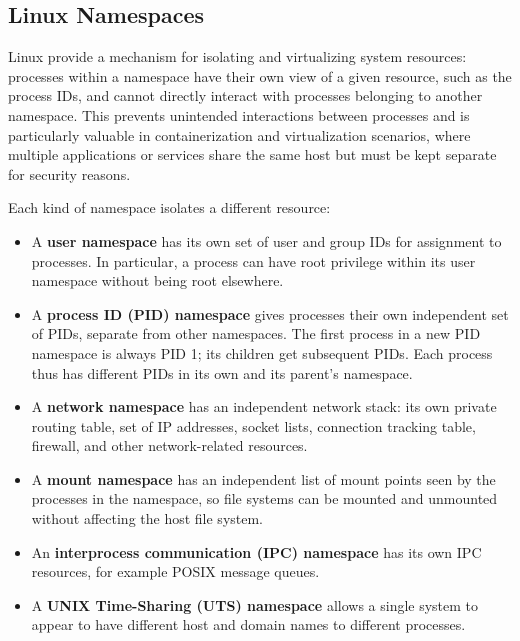\subsection{Linux Namespaces} \label{sec:linux_namespaces}

Linux  provide a mechanism for isolating and virtualizing system resources: processes within a namespace have their own view of a given resource, such as the process IDs, and cannot directly interact with processes belonging to another namespace. This prevents unintended interactions between processes and is particularly valuable in containerization and virtualization scenarios, where multiple applications or services share the same host but must be kept separate for security reasons. 

Each kind of namespace isolates a different resource:

\begin{itemize}
    \item A \textbf{user namespace} has its own set of user and group IDs for assignment to processes. In particular, a process can have root privilege within its user namespace without being root elsewhere.
    \item A \textbf{process ID (PID) namespace} gives processes their own independent set of PIDs, separate from other namespaces. The first process in a new PID namespace is always PID 1; its children get subsequent PIDs. Each process thus has different PIDs in its own and its parent's namespace.
    \item A \textbf{network namespace} has an independent network stack: its own private routing table, set of IP addresses, socket lists, connection tracking table, firewall, and other network-related resources.
    \item A \textbf{mount namespace} has an independent list of mount points seen by the processes in the namespace, so file systems can be mounted and unmounted without affecting the host file system.
    \item An \textbf{interprocess communication (IPC) namespace} has its own IPC resources, for example POSIX message queues.
    \item A \textbf{UNIX Time-Sharing (UTS) namespace} allows a single system to appear to have different host and domain names to different processes.
\end{itemize}

\medskip

